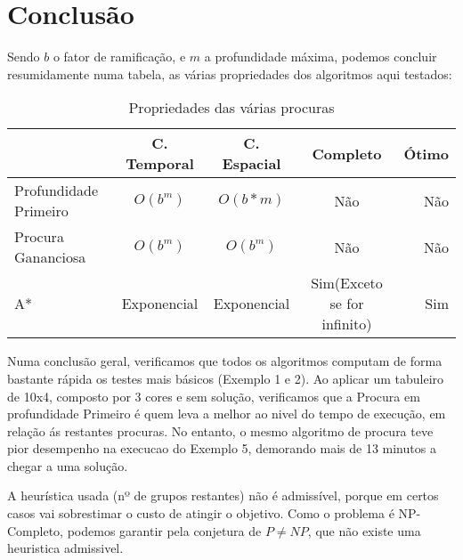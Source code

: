 \documentclass{scrartcl}
\begin{document}
\section*{Conclusão}

Sendo $b$ o fator de ramificação, e $m$ a profundidade máxima, podemos concluir resumidamente numa tabela, as várias propriedades dos algoritmos aqui testados:

	\begin{table}[h!]
	  \centering
	  \caption{Propriedades das várias procuras}
	  \label{tab: Comparação}
	  \begin{tabular}{l|c|c|c|r}
	     & C. Temporal & C. Espacial & Completo & Ótimo \\
	    \hline
	    Profundidade Primeiro & $O(b^m)$ & $O(b*m)$ & Não & Não \\
	    \hline
	    Procura Gananciosa & $O(b^m)$ & $O(b^m)$ & Não & Não \\
	    \hline
	    A* & Exponencial & Exponencial & Sim(Exceto se for infinito) & Sim \\
	    \hline
	  \end{tabular}
	\end{table}

Numa conclusão geral, verificamos que todos os algoritmos computam de forma bastante rápida os testes mais básicos (Exemplo 1 e 2). Ao aplicar um tabuleiro de 10x4, composto por 3 cores e sem solução, verificamos que a Procura em profundidade Primeiro é quem leva a melhor ao nivel do tempo de execução, em relação ás restantes procuras. No entanto, o mesmo algoritmo de procura teve pior desempenho na execucao do Exemplo 5, demorando mais de 13 minutos a chegar a uma solução.


A heurística usada (nº de grupos restantes) não é admissível, porque em certos casos vai sobrestimar o custo de atingir o objetivo. Como o problema é NP-Completo, podemos garantir pela conjetura de $P \neq NP$, que não existe uma heuristica admissivel.
\end{document}
